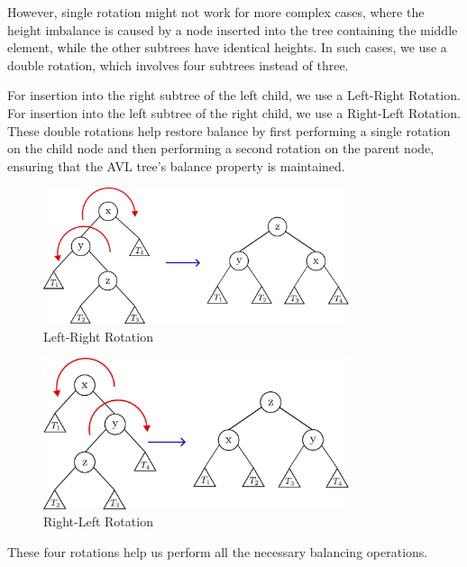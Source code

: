 However, single rotation might not work for more complex cases, where the height imbalance is caused by a node inserted into the tree containing the middle element, while the other subtrees have identical heights. In such cases, we use a double rotation, which involves four subtrees instead of three.

For insertion into the right subtree of the left child, we use a Left-Right Rotation. For insertion into the left subtree of the right child, we use a Right-Left Rotation. These double rotations help restore balance by first performing a single rotation on the child node and then performing a second rotation on the parent node, ensuring that the AVL tree's balance property is maintained.

\begin{minipage}{0.5\textwidth}
\begin{figure}[H]
  \centering
  \includegraphics[width=0.8\textwidth]{Figure/LR.pdf}
  \caption*{Left-Right Rotation}
\end{figure}
\end{minipage}
\begin{minipage}{0.5\textwidth}
\begin{figure}[H]
  \centering
  \includegraphics[width=0.8\textwidth]{Figure/RL.pdf}
  \caption*{Right-Left Rotation}
\end{figure}
\end{minipage} 

These four rotations help us perform all the necessary balancing operations.

